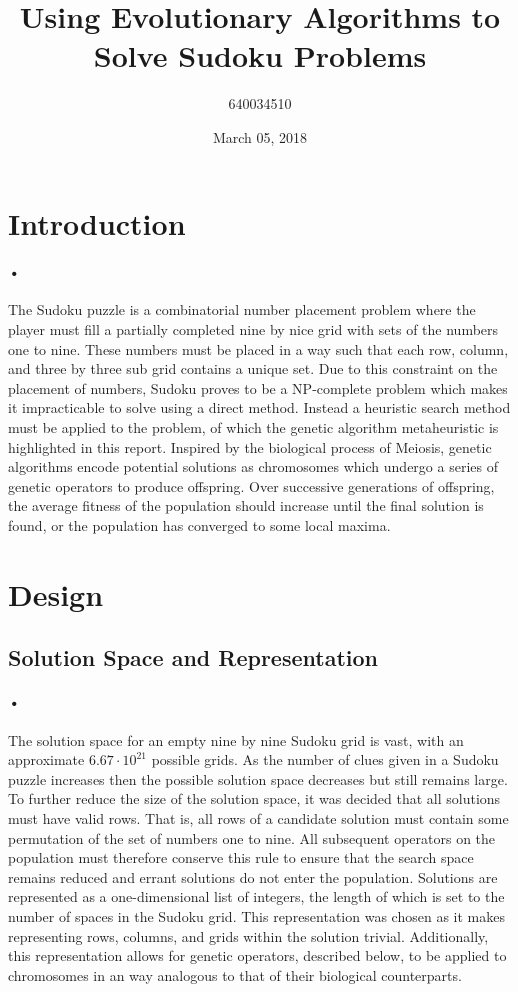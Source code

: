 \documentclass[10pt]{article}
\begin{document}
\title{%
	Using Evolutionary Algorithms to Solve Sudoku Problems
	}
\author{640034510}
\date{March 05, 2018}
\maketitle

\section{Introduction}
\paragraph{•}
The Sudoku puzzle is a combinatorial number placement problem where the player must fill a partially completed nine by nice grid with sets of the numbers one to nine. These numbers must be placed in a way such that each row, column, and three by three sub grid contains a unique set. Due to this constraint on the placement of numbers, Sudoku proves to be a NP-complete problem which makes it impracticable to solve using a direct method. Instead a heuristic search method must be applied to the problem, of which the genetic algorithm metaheuristic is highlighted in this report. Inspired by the biological process of Meiosis, genetic algorithms encode potential solutions as chromosomes which undergo a series of genetic operators to produce offspring. Over successive generations of offspring, the average fitness of the population should increase until the final solution is found, or the population has converged to some local maxima.
\section{Design}
\subsection{Solution Space and Representation}
\paragraph{•}
The solution space for an empty nine by nine Sudoku grid is vast, with an approximate $6.67\cdot10^{21}$ possible grids. As the number of clues given in a Sudoku puzzle increases then the possible solution space decreases but still remains large. To further reduce the size of the solution space, it was decided that all solutions must have valid rows. That is, all rows of a candidate solution must contain some permutation of the set of numbers one to nine. All subsequent operators on the population must therefore conserve this rule to ensure that the search space remains reduced and errant solutions do not enter the population. Solutions are represented as a one-dimensional list of integers, the length of which is set to the number of spaces in the Sudoku grid. This representation was chosen as it makes representing rows, columns, and grids within the solution trivial. Additionally, this representation allows for genetic operators, described below, to be applied to chromosomes in an way analogous to that of their biological counterparts.
\end{document}
